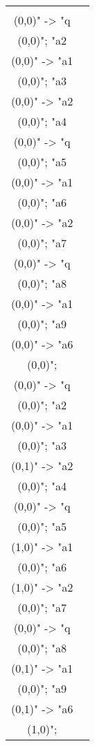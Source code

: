 \documentclass[12pt]{article}
\theoremstyle{defi}
\theoremstyle{not}
\theoremstyle{prob}
\begin{document}
      \begin{figure}
        \centering
        \begin{tabular}{cc}
          \begin{tikzpicture}[>=stealth]
          \graph [ layered layout, nodes = {scale=0.75, align=center} ] {
          "a1\\ (0,0)" -> "q\\ (0,0)";
          "a2\\ (0,0)" -> "a1\\ (0,0)";
          "a3\\ (0,0)" -> "a2\\ (0,0)";
          "a4\\ (0,0)" -> "q\\ (0,0)";
          "a5\\ (0,0)" -> "a1\\ (0,0)";
          "a6\\ (0,0)" -> "a2\\ (0,0)";
          "a7\\ (0,0)" -> "q\\ (0,0)";
          "a8\\ (0,0)" -> "a1\\ (0,0)";
          "a9\\ (0,0)" -> "a6\\ (0,0)";
          };
          \end{tikzpicture} &

          \begin{tikzpicture}[>=stealth]
          \graph [ layered layout, nodes = {scale=0.75, align=center} ] {
          "a1\\ (0,0)" -> "q\\ (0,0)";
          "a2\\ (0,0)" -> "a1\\ (0,0)";
          "a3\\ (0,1)" -> "a2\\ (0,0)";
          "a4\\ (0,0)" -> "q\\ (0,0)";
          "a5\\ (1,0)" -> "a1\\ (0,0)";
          "a6\\ (1,0)" -> "a2\\ (0,0)";
          "a7\\ (0,0)" -> "q\\ (0,0)";
          "a8\\ (0,1)" -> "a1\\ (0,0)";
          "a9\\ (0,1)" -> "a6\\ (1,0)";
          };
          \end{tikzpicture} \\


\end{tabular}
\end{figure}
\end{document}
